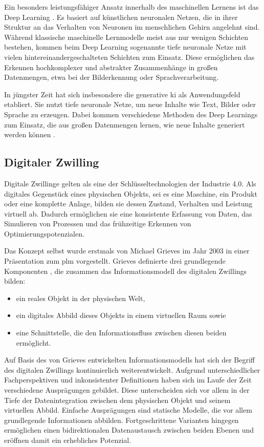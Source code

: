 Ein besonders leistungsfähiger Ansatz innerhalb des maschinellen Lernens ist das Deep Learning \cite{DLEinordnung}.
Es basiert auf künstlichen neuronalen Netzen, die in ihrer Struktur an das Verhalten von Neuronen im menschlichen Gehirn angelehnt sind.
Während klassische maschinelle Lernmodelle meist aus nur wenigen Schichten bestehen, kommen beim Deep Learning sogenannte tiefe neuronale Netze mit vielen hintereinandergeschalteten Schichten zum Einsatz.
Diese ermöglichen das Erkennen hochkomplexer und abstrakter Zusammenhänge in großen Datenmengen, etwa bei der Bilderkennung oder Sprachverarbeitung. \cite{DLDefinition}

In jüngster Zeit hat sich insbesondere die generative \acs{ki} als Anwendungsfeld etabliert. 
Sie nutzt tiefe neuronale Netze, um neue Inhalte wie Text, Bilder oder Sprache zu erzeugen. 
Dabei kommen verschiedene Methoden des Deep Learnings zum Einsatz, die aus großen Datenmengen lernen, wie neue Inhalte generiert werden können \cite{GenerativeKI}.

\newpage
\subsection{Digitaler Zwilling}
\label{sec: DT}
Digitale Zwillinge gelten als eine der Schlüsseltechnologien der Industrie 4.0.
Als digitales Gegenstück eines physischen Objekts, sei es eine Maschine, ein Produkt oder eine komplette Anlage, bilden sie dessen Zustand, Verhalten und Leistung virtuell ab.
Dadurch ermöglichen sie eine konsistente Erfassung von Daten, das Simulieren von Prozessen und das frühzeitige Erkennen von Optimierungspotenzialen.

Das Konzept selbst wurde erstmals von Michael Grieves im Jahr 2003 in einer Präsentation zum \ac{plm} vorgestellt. 
Grieves definierte drei grundlegende Komponenten \cite{DTGrieves}, die zusammen das Informationsmodell des digitalen Zwillings bilden:
\begin{itemize}
    \item ein reales Objekt in der physischen Welt,
    \item ein digitales Abbild dieses Objekts in einem virtuellen Raum sowie
    \item eine Schnittstelle, die den Informationsfluss zwischen diesen beiden ermöglicht.
\end{itemize}

Auf Basis des von Grieves entwickelten Informationsmodells hat sich der Begriff des digitalen Zwillings kontinuierlich weiterentwickelt. 
Aufgrund unterschiedlicher Fachperspektiven und inkonsistenter Definitionen haben sich im Laufe der Zeit verschiedene Ausprägungen gebildet. 
Diese unterscheiden sich vor allem in der Tiefe der Datenintegration zwischen dem physischen Objekt und seinem virtuellen Abbild. 
Einfache Ausprägungen sind statische Modelle, die vor allem grundlegende Informationen abbilden. 
Fortgeschrittene Varianten hingegen ermöglichen einen bidirektionalen Datenaustausch zwischen beiden Ebenen und eröffnen damit ein erhebliches Potenzial.

